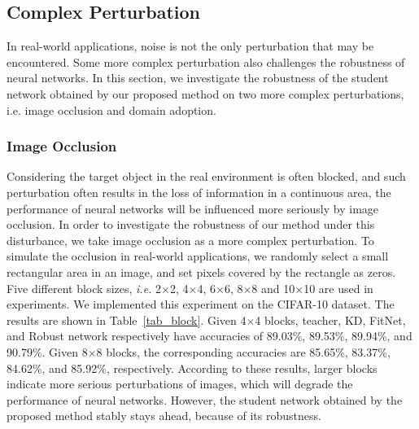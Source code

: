 \documentclass[journal]{IEEEtran}
\newcommand{\Tref}[1]{Table~\ref{#1}}
\begin{document}
\subsection{Complex Perturbation}
In real-world applications, noise is not the only perturbation that may be encountered. Some more complex perturbation also challenges the robustness of neural networks. In this section, we investigate the robustness of the student network obtained by our proposed method on two more complex perturbations, i.e. image occlusion and domain adoption. 

\subsubsection{Image Occlusion}
Considering the target object in the real environment is often blocked, and such perturbation often results in the loss of information in a continuous area, the performance of neural networks will be influenced more seriously by image occlusion. 
In order to investigate the robustness of our method under this disturbance, we take image occlusion as a more complex perturbation. To simulate the occlusion in real-world applications, we randomly select a small rectangular area in an image, and set pixels covered by the rectangle as zeros. Five different block sizes, \emph{i.e.} 2$\times$2, 4$\times$4, 6$\times$6, 8$\times$8 and 10$\times$10 are used in experiments. We implemented this experiment on the CIFAR-10 dataset. The results are shown in \Tref{tab_block}. Given 4$\times$4 blocks, teacher, KD, FitNet, and Robust network respectively have accuracies of 89.03\%, 89.53\%, 89.94\%, and 90.79\%. Given 8$\times$8 blocks, the corresponding accuracies are 85.65\%, 83.37\%, 84.62\%, and 85.92\%, respectively. According to these results, larger blocks indicate more serious perturbations of images, which will degrade the performance of neural networks. However, the student network obtained by the proposed method stably stays ahead, because of its robustness. 
\end{document}
